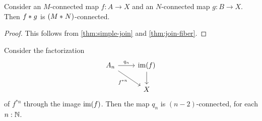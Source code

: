 \begin{thm}\label{thm:join-connectivity}
Consider an $M$-connected map $f:A\to X$ and an $N$-connected map $g:B\to X$. Then ${f}\ast_{}{g}$ is $({M}\ast_{}{N})$-connected.
\end{thm}

\begin{proof}
This follows from \autoref{thm:simple-join} and \cref{thm:join-fiber}.
\end{proof}

\begin{thm}\label{thm:joinconstruction-connectivity}
Consider the factorization
\begin{equation*}
\begin{tikzcd}
A_n \arrow[dr,swap,"f^{\ast n}"] \arrow[r,"q_n"] & \im(f) \arrow[d] \\
& X
\end{tikzcd}
\end{equation*}
of $f^{\ast n}$ through the image $\operatorname{im}(f)$. 
Then the map $q_n$ is $(n-2)$-connected, for each $n:\mathbb{N}$.
\end{thm}

